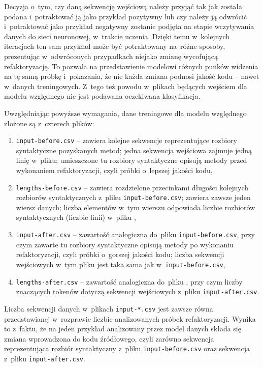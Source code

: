 \documentclass[twoside]{praca}
\begin{document}
Decyzja o~tym, czy daną sekwencję wejściową należy przyjąć tak jak została podana i~potraktować ją jako przykład pozytywny lub czy należy ją odwrócić i~potraktować jako przykład negatywny zostanie podjęta na etapie wczytywania danych do sieci neuronowej, w~trakcie uczenia. Dzięki temu w~kolejnych iteracjach ten sam przykład może być potraktowany na~różne sposoby, prezentując w~odwróconych przypadkach niejako zmianę wycofującą refaktoryzację. To pozwala na przedstawienie modelowi różnych punków widzenia na tę samą próbkę i~pokazania, że nie każda zmiana podnosi jakość kodu -- nawet w~danych treningowych. Z~tego też powodu w~plikach będących wejściem dla modelu względnego nie jest podawana oczekiwana klasyfikacja.

Uwzględniając powyższe wymagania, dane treningowe dla modelu względnego złożone są z~czterech plików:

\begin{enumerate}
\item \texttt{input-before.csv} -- zawiera kolejne sekwencje reprezentujące rozbiory syntaktyczne pozyskanych metod; jedna sekwencja wejściowa zajmuje jedną linię w~pliku; umieszczone tu rozbiory syntaktyczne opisują metody przed wykonaniem refaktoryzacji, czyli próbki o~lepszej jakości kodu,
\item \texttt{lengths-before.csv} -- zawiera rozdzielone przecinkami długości kolejnych rozbiorów syntaktycznych z~pliku \texttt{input-before.csv}; zawiera zawsze jeden wiersz danych; liczba elementów w~tym wierszu odpowiada liczbie rozbiorów syntaktycznych (liczbie linii) w~pliku ,
\item \texttt{input-after.csv} -- zawartość analogiczna do~pliku \texttt{input-before.csv}, przy czym zawarte tu rozbiory syntaktyczne opisują metody po wykonaniu refaktoryzacji, czyli próbki o~gorszej jakości kodu; liczba sekwencji wejściowych w~tym pliku jest taka sama jak w~\texttt{input\--before.csv},
\item \texttt{lengths-after.csv} -- zawartość analogiczna do~pliku , przy czym liczby znaczących tokenów dotyczą sekwencji wejściowych z~pliku \texttt{input-after.csv}.
\end{enumerate}

Liczba sekwencji danych w~plikach \texttt{input-*.csv} jest zawsze równa przedstawianej w~rozprawie liczbie analizowanych próbek refaktoryzacji. Wynika to z~faktu, że na jeden przykład analizowany przez model danych składa się zmiana wprowadzona do kodu źródłowego, czyli zarówno sekwencja reprezentująca rozbiór syntaktyczny z~pliku \texttt{input-before.csv} oraz sekwencja z~pliku \texttt{input-after.csv}.
\end{document}
